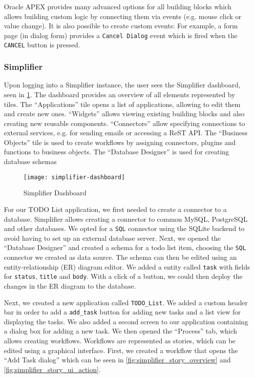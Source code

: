 \documentclass[runningheads]{llncs}
\begin{document}
Oracle APEX provides many advanced options for all building blocks which allows building custom logic by connecting them via events (e.g. mouse click or value change). It is also possible to create custom events: For example, a form page (in dialog form) provides a \texttt{Cancel Dialog} event which is fired when the \texttt{CANCEL} button is pressed.

\subsubsection{Simplifier}

Upon logging into a Simplifier instance, the user sees the Simplifier dashboard, seen in \cref{fig:simplifier_dashboard}. The dashboard provides an overview of all elements represented by tiles. The “Applications” tile opens a list of applications, allowing to edit them and create new ones. “Widgets” allows viewing existing building blocks and also creating new reusable components. “Connectors” allow specifying connections to external services, e.g. for sending emails or accessing a ReST API. The “Business Objects” tile is used to create workflows by assigning connectors, plugins and functions to business objects. The “Database Designer” is used for creating database schemas

\begin{figure}
  \centering
  \texttt{[image: simplifier-dashboard]}
  \caption{Simplifier Dashboard}
  \label{fig:simplifier_dashboard}
\end{figure}

For our TODO List application, we first needed to create a connector to a database. Simplifier allows creating a connector to common MySQL, PostgreSQL and other databases. We opted for a \texttt{SQL} connector using the SQLite backend to avoid having to set up an external database server. Next, we opened the “Database Designer” and created a schema for a todo list item, choosing the \texttt{SQL} connector we created as data source. The schema can then be edited using an entity-relationship (ER) diagram editor. We added a entity called \texttt{task} with fields for \texttt{status}, \texttt{title} and \texttt{body}. With a click of a button, we could then deploy the changes in the ER diagram to the database.

Next, we created a new application called \texttt{TODO\_List}. We added a custom header bar in order to add a \texttt{add\_task} button for adding new tasks and a list view for displaying the tasks. We also added a second screen to our application containing a dialog box for adding a new task. We then opened the “Process” tab, which allows creating workflows. Workflows are represented as stories, which can be edited using a graphical interface. First, we created a workflow that opens the “Add Task dialog” which can be seen in \cref{fig:simplifier_story_overview} and \cref{fig:simplifier_story_ui_action}.
\end{document}
